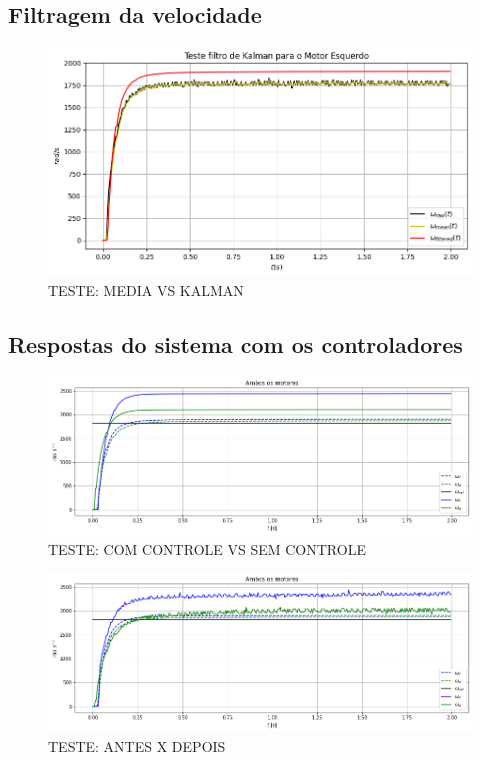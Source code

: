 \subsection{Filtragem da velocidade}

\begin{figure}[H]
    \centering
    \includegraphics[width=13cm]{graficos/plot_test_media_x_kalman.png}
    \caption{TESTE: MEDIA VS KALMAN}
\end{figure}

\subsection{Respostas do sistema com os controladores}


\begin{figure}[H]
    \centering
    \includegraphics[width=13cm]{graficos/plot_test.png}
    \caption{TESTE: COM CONTROLE VS SEM CONTROLE}
\end{figure}

\begin{figure}[H]
    \centering
    \includegraphics[width=13cm]{graficos/plot_test_antes_x_depois.png}
    \caption{TESTE: ANTES X DEPOIS}
\end{figure}
